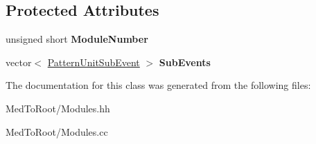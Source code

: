 \subsection*{Protected Attributes}
\begin{DoxyCompactItemize}
\item 
\mbox{\label{class_pattern_unit_a23d9e67b29f7a16af89cea12293f0d4b}} 
unsigned short {\bfseries Module\+Number}
\item 
\mbox{\label{class_pattern_unit_ac405794a8bdd20dc9dd249ee0251677c}} 
vector$<$ \hyperlink{class_pattern_unit_sub_event}{Pattern\+Unit\+Sub\+Event} $>$ {\bfseries Sub\+Events}
\end{DoxyCompactItemize}


The documentation for this class was generated from the following files\+:\begin{DoxyCompactItemize}
\item 
Med\+To\+Root/Modules.\+hh\item 
Med\+To\+Root/Modules.\+cc\end{DoxyCompactItemize}
